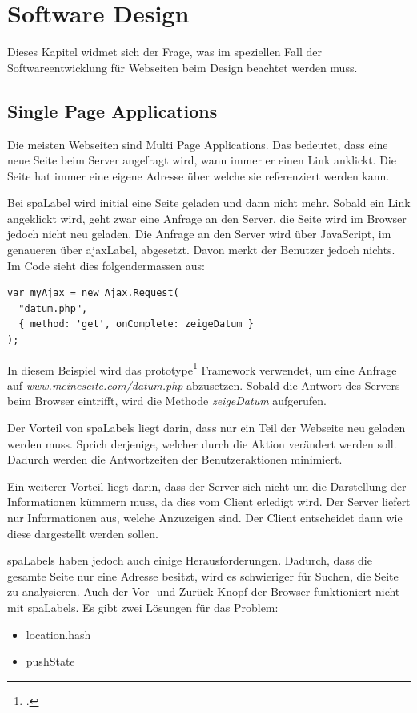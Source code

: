 \setcounter{secnumdepth}{3}
\chapter{Software Design}
Dieses Kapitel widmet sich der Frage, was im speziellen Fall der Softwareentwicklung für Webseiten beim Design beachtet werden muss.

\section{Single Page Applications}
\label{sec:softwaredesign:singlepageapplications}
Die meisten Webseiten sind Multi Page Applications. Das bedeutet, dass eine neue Seite beim Server angefragt wird, wann immer er einen Link anklickt. Die Seite hat immer eine eigene Adresse über welche sie referenziert werden kann.

Bei \gls{spaLabel} wird initial eine Seite geladen und dann nicht mehr. Sobald ein Link angeklickt wird, geht zwar eine Anfrage an den Server, die Seite wird im Browser jedoch nicht neu geladen. Die Anfrage an den Server wird über JavaScript, im genaueren über \gls{ajaxLabel}, abgesetzt. Davon merkt der Benutzer jedoch nichts. Im Code sieht dies folgendermassen aus:

\begin{lstlisting}
var myAjax = new Ajax.Request(
  "datum.php",
  { method: 'get', onComplete: zeigeDatum }
);
\end{lstlisting}

In diesem Beispiel wird das prototype\footcite{Prototype_JavaScript_framework_a_foundation_for_ambitious_web_applications_2015-06-07} Framework verwendet, um eine Anfrage auf \textit{www.meineseite.com/datum.php} abzusetzen. Sobald die Antwort des Servers beim Browser eintrifft, wird die Methode \textit{zeigeDatum} aufgerufen.

Der Vorteil von \glspl{spaLabel} liegt darin, dass nur ein Teil der Webseite neu geladen werden muss. Sprich derjenige, welcher durch die Aktion verändert werden soll. Dadurch werden die Antwortzeiten der Benutzeraktionen minimiert.

Ein weiterer Vorteil liegt darin, dass der Server sich nicht um die Darstellung der Informationen kümmern muss, da dies vom Client erledigt wird. Der Server liefert nur Informationen aus, welche Anzuzeigen sind. Der Client entscheidet dann wie diese dargestellt werden sollen.

\glspl{spaLabel} haben jedoch auch einige Herausforderungen. Dadurch, dass die gesamte Seite nur eine Adresse besitzt, wird es schwieriger für Suchen, die Seite zu analysieren. Auch der Vor- und Zurück-Knopf der Browser funktioniert nicht mit \glspl{spaLabel}. Es gibt zwei Lösungen für das Problem:
\begin{itemize}
\item location.hash
\item pushState
\end{itemize}

